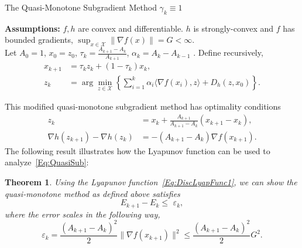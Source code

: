 \documentclass[11pt]{article}
\theoremstyle{plain}
\newtheorem{theorem}{Theorem}
\newcommand{\X}{{\mathcal X}}
\begin{document}
\begin{algorithm}[H]
\caption{The Quasi-Monotone Subgradient Method $\gamma_k \equiv 1$}
{\bf Assumptions:} $f, h$ are convex and differentiable. $h$ is strongly-convex and $f$ has bounded gradients, $\sup_{x\in\X}\|\nabla f(x)\| = G <\infty$. \\
Let $A_0 = 1$, $x_0 = z_0$, $\tau_k = \frac{A_{k+1} - A_k}{A_{k+1}}$, $\alpha_k = A_{k} - A_{k-1}$ . Define recursively,
\begin{subequations}\label{Eq:QuasiSub1}
\begin{align}
x_{k+1} &= \tau_k z_k + (1 - \tau_k)x_{k} ,\label{Eq:ZSeqQuasi1}\\
z_k &= \arg \min_{z\in \X} \left\{ \sum_{i=1}^k \alpha_i \langle \nabla f(x_i), z\rangle + D_h(z, x_0)\right\} \label{Eq:XSeqQuasi1}.
\end{align} 
\end{subequations}
\end{algorithm}
\noindent This modified quasi-monotone subgradient method has optimality conditions
\begin{subequations}\label{Eq:QuasiSub}
\begin{align}
z_{k} &= x_{k} + \frac{A_{k+1}}{A_{k+1} -A_{k}} (x_{k+1} - x_k),\label{Eq:ZSeqQuasi}\\
\nabla h(z_{k+1}) -\nabla h(z_k) &= -(A_{k+1} - A_{k})\nabla f(x_{k+1})\label{Eq:XSeqQuasi}.
\end{align} 
\end{subequations}
The following result illustrates how the Lyapunov function can be used to analyze~\eqref{Eq:QuasiSub}:
\begin{theorem}
\label{Thm:Quasi}
Using the Lyapunov function~\eqref{Eq:DiscLyapFunc1},
we can show the quasi-monotone method as defined above satisfies \[E_{k+1} - E_k \leq \,\,\varepsilon_k,\] where the error scales in the following way,%
\[\varepsilon_k = \frac{(A_{k+1}- A_k)^2}{2}\|\nabla f(x_{k+1})\|^2 \leq \frac{(A_{k+1}- A_k)^2}{2}G^2.\]
\end{theorem}
\end{document}
